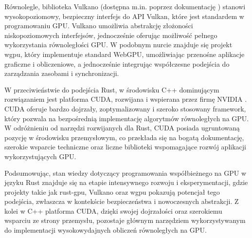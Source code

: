Równolegle, biblioteka Vulkano (dostępna m.in. poprzez dokumentację \cite{docsVulkanoRust}) stanowi wysokopoziomowy, bezpieczny interfejs do API Vulkan, które jest standardem w programowaniu GPU. Vulkano umożliwia abstrakcję złożoności niskopoziomowych interfejsów, jednocześnie oferując możliwość pełnego wykorzystania równoległości GPU. W podobnym nurcie znajduje się projekt wgpu, który implementuje standard WebGPU, umożliwiając przenośne aplikacje graficzne i obliczeniowe, a jednocześnie integrując współczesne podejścia do zarządzania zasobami i synchronizacji.

W przeciwieństwie do podejścia Rust, w środowisku C++ dominującym rozwiązaniem jest platforma CUDA, rozwijana i wspierana przez firmę NVIDIA \cite{nvidiaCUDAToolkit}. CUDA oferuje bardzo dojrzały, zoptymalizowany i szeroko stosowany framework, który pozwala na bezpośrednią implementację algorytmów równoległych na GPU. W odróżnieniu od narzędzi rozwijanych dla Rust, CUDA posiada ugruntowaną pozycję w środowisku przemysłowym, co przekłada się na bogatą dokumentację, szerokie wsparcie techniczne oraz liczne biblioteki wspomagające rozwój aplikacji wykorzystujących GPU.

Podsumowując, stan wiedzy dotyczący programowania współbieżnego na GPU w języku Rust znajduje się na etapie intensywnego rozwoju i eksperymentacji, gdzie projekty takie jak rust-gpu, Vulkano oraz wgpu \cite{wgpuWgpuPortable} pokazują potencjał tego podejścia, zwłaszcza w kontekście bezpieczeństwa i nowoczesnych abstrakcji. Z kolei w C++ platforma CUDA, dzięki swojej dojrzałości oraz szerokiemu wsparciu ze strony przemysłu, pozostaje głównym narzędziem wykorzystywanym do implementacji wysokowydajnych obliczeń równoległych na GPU.

